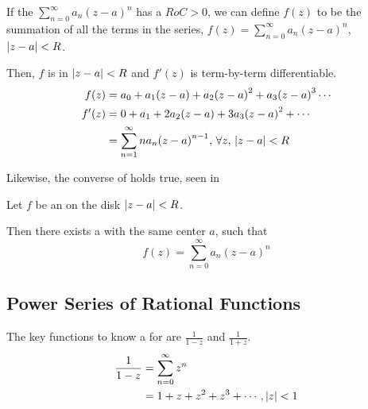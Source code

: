 \begin{theorem}\label{thm:Power_Series-Analytic_Function}
  If the  $\sum_{n=0}^{\infty} a_{n} {(z-a)}^{n}$ has a  $RoC > 0$, we can define $f(z)$ to be the summation of all the terms in the series, $f(z) = \sum_{n = 0}^{\infty} a_{n} {(z-a)}^{n}$, $\left\lvert z-a \right\rvert < R$.

  Then, $f$ is  in $\left\lvert z-a \right\rvert < R$ and $f'(z)$ is term-by-term differentiable.
  \begin{align*}
    f(z) &= a_{0} + a_{1} (z-a) + a_{2} {(z-a)}^{2} + a_{3} {(z-a)}^{3} \cdots \\
    f'(z) &= 0 + a_{1} + 2 a_{2} (z-a) + 3 a_{3} {(z-a)}^{2} + \cdots \\
         &= \sum_{n=1}^{\infty} n a_{n} {(z-a)}^{n-1}, \, \forall z, \, \left\lvert z-a \right\rvert < R
  \end{align*}
\end{theorem}

Likewise, the converse of  holds true, seen in 

\begin{theorem}\label{thm:Analytic_Function-Power_Series}
  Let $f$ be an   on the disk $\left\lvert z-a \right\rvert < R$.

  Then there exists a  with the same center $a$, such that
  \begin{equation*}
    f(z) = \sum_{n = 0}^{\infty} a_{n} {(z-a)}^{n}
  \end{equation*}
\end{theorem}



\subsection{Power Series of Rational Functions}\label{subsec:Complex_Power_Series-Rational_Functions}
The key functions to know a  for are $\frac{1}{1-z}$ and $\frac{1}{1+z}$.
\begin{equation}\label{eq:Complex_Power_Series-1-z}
  \begin{aligned}
    \frac{1}{1-z} &= \sum_{n=0}^{\infty} z^{n} \\
    &= 1 + z + z^{2} + z^{3} + \cdots \, , \left\lvert z \right\rvert < 1
  \end{aligned}
\end{equation}

